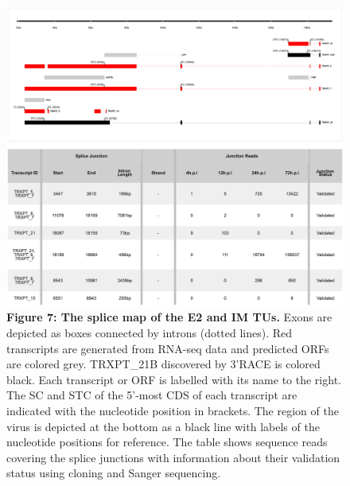 \documentclass[
]{article}
\begin{document}
\begin{figure}
\centering
\includegraphics{results/r/figures/figure_7.png}
\caption{\textbf{Figure 7: The splice map of the E2 and IM TUs.} Exons
are depicted as boxes connected by introns (dotted lines). Red
transcripts are generated from RNA-seq data and predicted ORFs are
colored grey. TRXPT\_21B discovered by 3'RACE is colored black. Each
transcript or ORF is labelled with its name to the right. The SC and STC
of the 5'-most CDS of each transcript are indicated with the nucleotide
position in brackets. The region of the virus is depicted at the bottom
as a black line with labels of the nucleotide positions for reference.
The table shows sequence reads covering the splice junctions with
information about their validation status using cloning and Sanger
sequencing.}
\end{figure}
\end{document}
